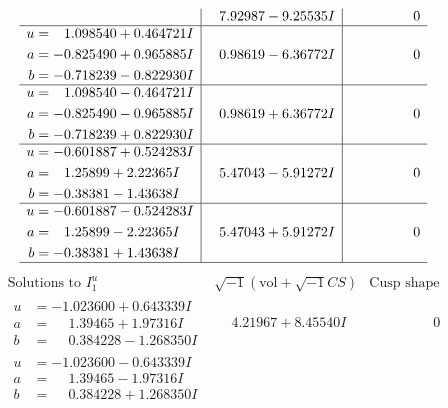\documentclass[1p]{elsarticle_modified}
\theoremstyle{definition}
\newcommand{\I}{\sqrt{-1}}
\begin{document}
$$\begin{array}{c|c|c}
 & \phantom{-}7.92987 - 9.25535 I & \phantom{-0.000000 } 0 \\ \hline\begin{aligned}
u &= \phantom{-}1.098540 + 0.464721 I \\
a &= -0.825490 + 0.965885 I \\
b &= -0.718239 - 0.822930 I\end{aligned}
 & \phantom{-}0.98619 - 6.36772 I & \phantom{-0.000000 } 0 \\ \hline\begin{aligned}
u &= \phantom{-}1.098540 - 0.464721 I \\
a &= -0.825490 - 0.965885 I \\
b &= -0.718239 + 0.822930 I\end{aligned}
 & \phantom{-}0.98619 + 6.36772 I & \phantom{-0.000000 } 0 \\ \hline\begin{aligned}
u &= -0.601887 + 0.524283 I \\
a &= \phantom{-}1.25899 + 2.22365 I \\
b &= -0.38381 - 1.43638 I\end{aligned}
 & \phantom{-}5.47043 - 5.91272 I & \phantom{-0.000000 } 0 \\ \hline\begin{aligned}
u &= -0.601887 - 0.524283 I \\
a &= \phantom{-}1.25899 - 2.22365 I \\
b &= -0.38381 + 1.43638 I\end{aligned}
 & \phantom{-}5.47043 + 5.91272 I & \phantom{-0.000000 } 0\\
 \hline 
 \end{array}$$\newpage$$\begin{array}{c|c|c}  
\text{Solutions to }I^u_{1}& \I (\text{vol} + \sqrt{-1}CS) & \text{Cusp shape}\\
 \hline 
\begin{aligned}
u &= -1.023600 + 0.643339 I \\
a &= \phantom{-}1.39465 + 1.97316 I \\
b &= \phantom{-}0.384228 - 1.268350 I\end{aligned}
 & \phantom{-}4.21967 + 8.45540 I & \phantom{-0.000000 } 0 \\ \hline\begin{aligned}
u &= -1.023600 - 0.643339 I \\
a &= \phantom{-}1.39465 - 1.97316 I \\
b &= \phantom{-}0.384228 + 1.268350 I\end{aligned}

\end{array}$$
\end{document}
